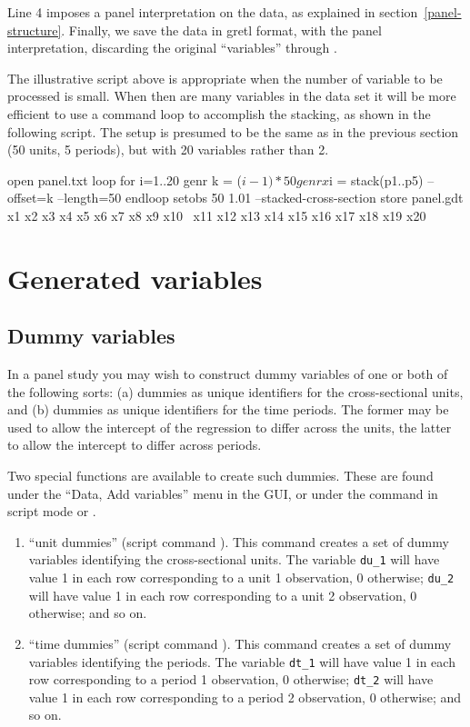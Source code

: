 Line 4 imposes a panel interpretation on the data, as explained in
section~\ref{panel-structure}.  Finally, we save the data in gretl
format, with the panel interpretation, discarding the original
``variables''  through .

The illustrative script above is appropriate when the number of
variable to be processed is small.  When then are many variables in
the data set it will be more efficient to use a command loop to
accomplish the stacking, as shown in the following script.  The setup
is presumed to be the same as in the previous section (50 units, 5
periods), but with 20 variables rather than 2.

\begin{code}
    open panel.txt
    loop for i=1..20
      genr k = ($i - 1) * 50
      genr x$i = stack(p1..p5) --offset=k --length=50
    endloop
    setobs 50 1.01 --stacked-cross-section
    store panel.gdt x1 x2 x3 x4 x5 x6 x7 x8 x9 x10 \
      x11 x12 x13 x14 x15 x16 x17 x18 x19 x20
\end{code}

\section{Generated variables}
\label{panel-genr}

\subsection{Dummy variables}
\label{dummies}

In a panel study you may wish to construct dummy variables of one or
both of the following sorts: (a) dummies as unique identifiers for the
cross-sectional units, and (b) dummies as unique identifiers for the
time periods.  The former may be used to allow the intercept of the
regression to differ across the units, the latter to allow the
intercept to differ across periods.

Two special functions are available to create such dummies.  These
are found under the ``Data, Add variables'' menu in the GUI, or under
the \cmd{genr} command in script mode or \app{gretlcli}.

\begin{enumerate}
\item ``unit dummies'' (script command ).  This
  command creates a set of dummy variables identifying the
  cross-sectional units.  The variable \verb+du_1+ will have value 1
  in each row corresponding to a unit 1 observation, 0 otherwise;
  \verb+du_2+ will have value 1 in each row corresponding to a unit 2
  observation, 0 otherwise; and so on.
\item ``time dummies'' (script command ).  This
  command creates a set of dummy variables identifying the periods.
  The variable \verb+dt_1+ will have value 1 in each row
  corresponding to a period 1 observation, 0 otherwise; \verb+dt_2+
  will have value 1 in each row corresponding to a period 2
  observation, 0 otherwise; and so on.
\end{enumerate}

